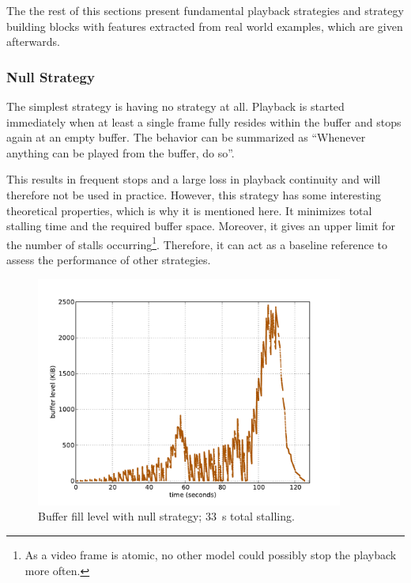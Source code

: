 The the rest of this sections present fundamental playback strategies and strategy building blocks with features extracted from real world examples, which are given afterwards. 



\subsubsection{Null Strategy}

The simplest strategy is having no strategy at all. Playback is started immediately when at least a single frame fully resides within the buffer and stops again at an empty buffer. The behavior can be summarized as ``Whenever anything can be played from the buffer, do so''.

This results in frequent stops and a large loss in playback continuity and will therefore not be used in practice. However, this strategy has some interesting theoretical properties, which is why it is mentioned here.
It minimizes total stalling time and the required buffer space. Moreover, it gives an upper limit for the number of stalls occurring\footnote{As a video frame is atomic, no other model could possibly stop the playback more often.}. Therefore, it can act as a baseline reference to assess the performance of other strategies.

\begin{figure}[htb]
    \centering
    \includegraphics[width=0.9\textwidth]{images/bufferlevel-stall-new.pdf}
    \caption{Buffer fill level with null strategy; \SI{33}{\second} total stalling.}
    \label{c3:fig:bufferlevel-stall}
\end{figure}


